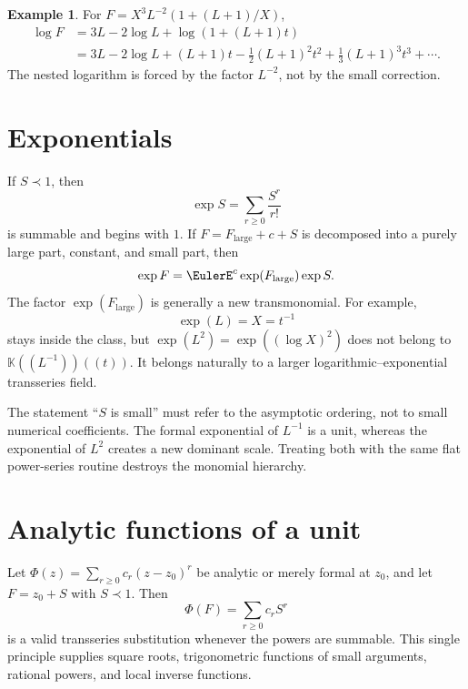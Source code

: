 \documentclass[11pt,oneside]{book}
\theoremstyle{definition}
\newtheorem{example}[theorem]{Example}
\theoremstyle{remark}
\newcommand{\K}{\mathbb K}
\newcommand{\precdom}{\prec}
\begin{document}
\begin{example}
For $F=X^3L^{-2}(1+(L+1)/X)$,
\begin{align*}
 \log F
 &=3L-2\log L+\log\left(1+(L+1)t\right)\\
 &=3L-2\log L+(L+1)t-\frac12(L+1)^2t^2
   +\frac13(L+1)^3t^3+\cdots.
\end{align*}
The nested logarithm is forced by the factor $L^{-2}$, not by the small
correction.
\end{example}

\section{Exponentials}
If $S\precdom1$, then
\begin{equation}\label{eq:exp-small}
 \exp S=\sum_{r\ge0}\frac{S^r}{r!}
\end{equation}
is summable and begins with $1$.  If
$F=F_{\mathrm{large}}+c+S$ is decomposed into a purely large part, constant,
and small part, then
\[
 \exp F=\EulerE^c\exp(F_{\mathrm{large}})\exp S.
\]
The factor $\exp(F_{\mathrm{large}})$ is generally a new transmonomial.
For example,
\[
 \exp(L)=X=t^{-1}
\]
stays inside the class, but $\exp(L^2)=\exp((\log X)^2)$ does not belong to
$\K((L^{-1}))((t))$.  It belongs naturally to a larger
logarithmic--exponential transseries field.

\begin{pitfallbox}
The statement ``$S$ is small'' must refer to the asymptotic ordering, not to
small numerical coefficients.  The formal exponential of $L^{-1}$ is a unit,
whereas the exponential of $L^2$ creates a new dominant scale.  Treating both
with the same flat power-series routine destroys the monomial hierarchy.
\end{pitfallbox}

\section{Analytic functions of a unit}
Let $\Phi(z)=\sum_{r\ge0}c_r(z-z_0)^r$ be analytic or merely formal at
$z_0$, and let $F=z_0+S$ with $S\precdom1$.  Then
\begin{equation}\label{eq:analytic-substitution-unit}
 \Phi(F)=\sum_{r\ge0}c_rS^r
\end{equation}
is a valid transseries substitution whenever the powers are summable.  This
single principle supplies square roots, trigonometric functions of small
arguments, rational powers, and local inverse functions.
\end{document}
